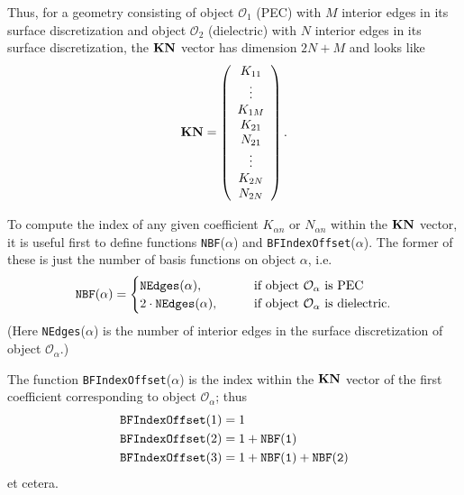 \documentclass[dvips,letterpaper]{article}
\begin{document}
Thus, for a geometry consisting of object $\mathcal{O}_1$ (PEC)
with $M$ interior edges in its surface discretization
and object $\mathcal{O}_2$ (dielectric) with $N$ interior edges
in its surface discretization, the $\mathbf{KN}$ vector has dimension
$2N+M$ and looks like
$$ \mathbf{KN}=\left(\begin{array}{c}
   K_{11} \\ 
   \vdots \\
   K_{1M} \\ 
   K_{21} \\ 
   N_{21} \\ 
   \vdots \\
   K_{2N} \\ 
   N_{2N}
   \end{array}\right).
$$

To compute the index of any given coefficient $K_{\alpha n}$ 
or $N_{\alpha n}$ within the $\mathbf{KN}$ vector,
it is useful first to define functions \texttt{NBF}($\alpha$) 
and \texttt{BFIndexOffset}($\alpha$). The former of these 
is just the number of basis functions on object $\alpha$,
i.e.
$$ \texttt{NBF}(\alpha) = 
   \begin{cases}
   \texttt{NEdges}(\alpha), \qquad &\text{if object $\mathcal{O}_\alpha$
                                          is PEC} \\
   2\cdot \tt{NEdges}(\alpha), 
                        \qquad &\text{if object $\mathcal{O}_\alpha$
                                      is dielectric.} \\
   \end{cases}
$$
(Here \texttt{NEdges}($\alpha$) is the number of interior edges 
in the surface discretization of object $\mathcal{O}_\alpha$.)

The function \texttt{BFIndexOffset}($\alpha$) is the index
within the $\mathbf{KN}$ vector of the first coefficient corresponding
to object $\mathcal{O}_\alpha$; thus 
\begin{align*}
 \texttt{BFIndexOffset}(1) &= 1 \\
 \texttt{BFIndexOffset}(2) &= 1 + \tt{NBF}(1) \\
 \texttt{BFIndexOffset}(3) &= 1 + \tt{NBF}(1) + \tt{NBF}(2) \\
\end{align*}
et cetera.
\end{document}
